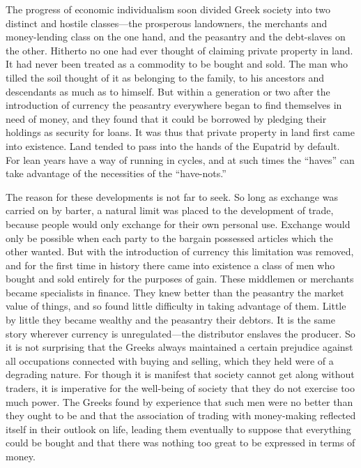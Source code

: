 \documentclass{book}
\begin{document}
The progress of economic individualism soon divided Greek society into two distinct and hostile classes—the prosperous landowners, the merchants and money-lending class on the one hand, and the peasantry and the debt-slaves on the other. Hitherto no one had ever thought of claiming private property in land. It had never been treated as a commodity to be bought and sold. The man who tilled the soil thought of it as belonging to the family, to his ancestors and descendants as much as to himself. But within a generation or two after the introduction of currency the peasantry everywhere began to find themselves in need of money, and they found that it could be borrowed by pledging their holdings as security for loans. It was thus that private property in land first came into existence. Land tended to pass into the hands of the Eupatrid by default. For lean years have a way of running in cycles, and at such times the “haves” can take advantage of the necessities of the “have-nots.”\footnotemark[1]

The reason for these developments is not far to seek. So long as exchange was carried on by barter, a natural limit was placed to the development of trade, because people would only exchange for their own personal use. Exchange would only be possible when each party to the bargain possessed articles which the other wanted. But with the introduction of currency this limitation was removed, and for the first time in history there came into existence a class of men who bought and sold entirely for the purposes of gain. These middlemen or merchants became specialists in finance. They knew better than the peasantry the market value of things, and so found little difficulty in taking advantage of them. Little by little they became wealthy and the peasantry their debtors. It is the same story wherever currency is unregulated—the distributor enslaves the producer. So it is not surprising that the Greeks always maintained a certain prejudice against all occupations connected with buying and selling, which they held were of a degrading nature. For though it is manifest that society cannot get along without traders, it is imperative for the well-being of society that they do not exercise too much power. The Greeks found by experience that such men were no better than they ought to be and that the association of trading with money-making reflected itself in their outlook on life, leading them eventually to suppose that everything could be bought and that there was nothing too great to be expressed in terms of money.\footnotemark[2]
\end{document}
